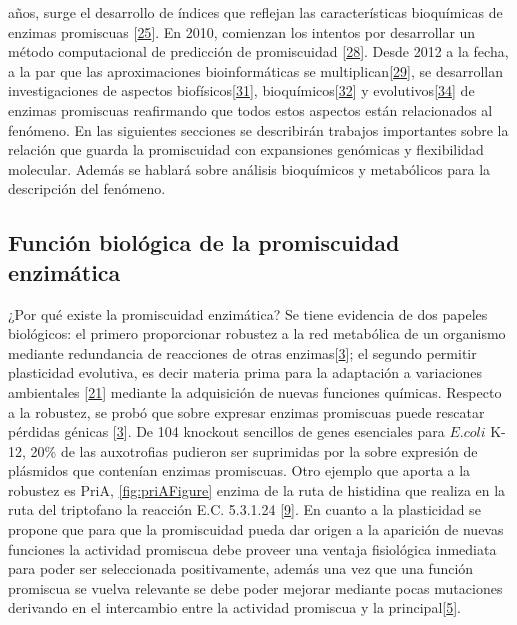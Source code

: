 \documentclass[12pt,twoside]{reedthesis}
\begin{document}
  años, surge el desarrollo de índices que reflejan las características
  bioquímicas de enzimas promiscuas
  {[}\protect\hyperlink{ref-nath_quantifying_2010}{25}{]}. En 2010,
  comienzan los intentos por desarrollar un método computacional de
  predicción de promiscuidad
  {[}\protect\hyperlink{ref-carbonell_molecular_2010}{28}{]}. Desde 2012 a
  la fecha, a la par que las aproximaciones bioinformáticas se
  multiplican{[}\protect\hyperlink{ref-nagao_prediction_2014}{29}{]}, se
  desarrollan investigaciones de aspectos
  biofísicos{[}\protect\hyperlink{ref-noda-garcia_evolution_2013}{31}{]},
  bioquímicos{[}\protect\hyperlink{ref-verdel-aranda_molecular_2015}{32}{]}
  y evolutivos{[}\protect\hyperlink{ref-copley_evolutionary_2015}{34}{]}
  de enzimas promiscuas reafirmando que todos estos aspectos están
  relacionados al fenómeno. En las siguientes secciones se describirán
  trabajos importantes sobre la relación que guarda la promiscuidad con
  expansiones genómicas y flexibilidad molecular. Además se hablará sobre
  análisis bioquímicos y metabólicos para la descripción del fenómeno.
  
  \subsection{Función biológica de la promiscuidad
  enzimática}\label{funcion-biologica-de-la-promiscuidad-enzimatica}
  
  ¿Por qué existe la promiscuidad enzimática? Se tiene evidencia de dos
  papeles biológicos: el primero proporcionar robustez a la red metabólica
  de un organismo mediante redundancia de reacciones de otras
  enzimas{[}\protect\hyperlink{ref-patrick_multicopy_2007}{3}{]}; el
  segundo permitir plasticidad evolutiva, es decir materia prima para la
  adaptación a variaciones ambientales
  {[}\protect\hyperlink{ref-aharoni_evolvability_2005}{21}{]} mediante la
  adquisición de nuevas funciones químicas. Respecto a la robustez, se
  probó que sobre expresar enzimas promiscuas puede rescatar pérdidas
  génicas {[}\protect\hyperlink{ref-patrick_multicopy_2007}{3}{]}. De 104
  knockout sencillos de genes esenciales para \(E. coli\) K-12, 20\% de
  las auxotrofias pudieron ser suprimidas por la sobre expresión de
  plásmidos que contenían enzimas promiscuas. Otro ejemplo que aporta a la
  robustez es PriA, \autoref{fig:priAFigure} enzima de la ruta de
  histidina que realiza en la ruta del triptofano la reacción E.C.
  5.3.1.24 {[}\protect\hyperlink{ref-baronagomez_occurrence_2003}{9}{]}.
  En cuanto a la plasticidad se propone que para que la promiscuidad pueda
  dar origen a la aparición de nuevas funciones la actividad promiscua
  debe proveer una ventaja fisiológica inmediata para poder ser
  seleccionada positivamente, además una vez que una función promiscua se
  vuelva relevante se debe poder mejorar mediante pocas mutaciones
  derivando en el intercambio entre la actividad promiscua y la
  principal{[}\protect\hyperlink{ref-khersonsky_enzyme_2010}{5}{]}.
  
\end{document}
